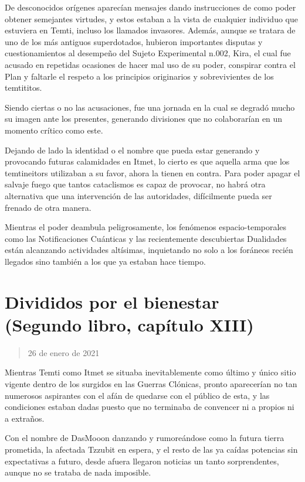 \documentclass[
]{book}
\begin{document}
De desconocidos orígenes aparecían mensajes dando instrucciones de como poder obtener semejantes virtudes, y estos estaban a la vista de cualquier individuo que estuviera en Temti, incluso los llamados invasores. Además, aunque se tratara de uno de los más antiguos superdotados, hubieron importantes disputas y cuestionamientos al desempeño del Sujeto Experimental n.002, Kira, el cual fue acusado en repetidas ocasiones de hacer mal uso de su poder, conspirar contra el Plan y faltarle el respeto a los principios originarios y sobrevivientes de los temtititos.

Siendo ciertas o no las acusaciones, fue una jornada en la cual se degradó mucho su imagen ante los presentes, generando divisiones que no colaborarían en un momento crítico como este.

Dejando de lado la identidad o el nombre que pueda estar generando y provocando futuras calamidades en Itmet, lo cierto es que aquella arma que los temtineitors utilizaban a su favor, ahora la tienen en contra. Para poder apagar el salvaje fuego que tantos cataclismos es capaz de provocar, no habrá otra alternativa que una intervención de las autoridades, difícilmente pueda ser frenado de otra manera.

Mientras el poder deambula peligrosamente, los fenómenos espacio-temporales como las Notificaciones Cuánticas y las recientemente descubiertas Dualidades están alcanzando actividades altísimas, inquietando no solo a los foráneos recién llegados sino también a los que ya estaban hace tiempo.

\hypertarget{divididos-por-el-bienestar-segundo-libro-capuxedtulo-xiii}{%
\section{Divididos por el bienestar (Segundo libro, capítulo XIII)}\label{divididos-por-el-bienestar-segundo-libro-capuxedtulo-xiii}}

\begin{quote}
26 de enero de 2021
\end{quote}

Mientras Temti como Itmet se situaba inevitablemente como último y único sitio vigente dentro de los surgidos en las Guerras Clónicas, pronto aparecerían no tan numerosos aspirantes con el afán de quedarse con el público de esta, y las condiciones estaban dadas puesto que no terminaba de convencer ni a propios ni a extraños.

Con el nombre de DasMooon danzando y rumoreándose como la futura tierra prometida, la afectada Tzzubit en espera, y el resto de las ya caídas potencias sin expectativas a futuro, desde afuera llegaron noticias un tanto sorprendentes, aunque no se trataba de nada imposible.
\end{document}
